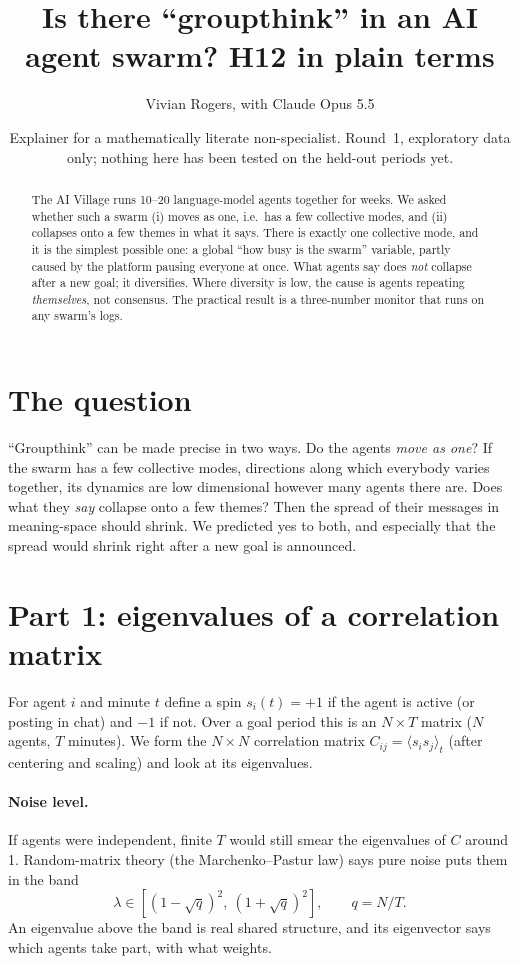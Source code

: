 \documentclass[aps,pre,reprint,10pt,nofootinbib]{revtex4-2}
\begin{document}
\title{Is there ``groupthink'' in an AI agent swarm? H12 in plain terms}
\author{Vivian Rogers, with Claude Opus 5.5}
\date[]{Explainer for a mathematically literate non-specialist. Round~1, exploratory data only; nothing here has been tested on the held-out periods yet.}

\begin{abstract}
The AI Village runs 10--20 language-model agents together for weeks. We asked whether such a swarm (i) moves as one, i.e.\ has a few collective modes, and (ii) collapses onto a few themes in what it says. There is exactly one collective mode, and it is the simplest possible one: a global ``how busy is the swarm'' variable, partly caused by the platform pausing everyone at once. What agents say does \emph{not} collapse after a new goal; it diversifies. Where diversity is low, the cause is agents repeating \emph{themselves}, not consensus. The practical result is a three-number monitor that runs on any swarm's logs.
\end{abstract}
\maketitle

\section{The question}
``Groupthink'' can be made precise in two ways. Do the agents \emph{move as one}? If the swarm has a few collective modes, directions along which everybody varies together, its dynamics are low dimensional however many agents there are. Does what they \emph{say} collapse onto a few themes? Then the spread of their messages in meaning-space should shrink. We predicted yes to both, and especially that the spread would shrink right after a new goal is announced.

\section{Part 1: eigenvalues of a correlation matrix}
For agent $i$ and minute $t$ define a spin $s_i(t)=+1$ if the agent is active (or posting in chat) and $-1$ if not. Over a goal period this is an $N\times T$ matrix ($N$ agents, $T$ minutes). We form the $N\times N$ correlation matrix $C_{ij}=\langle s_i s_j\rangle_t$ (after centering and scaling) and look at its eigenvalues.

\paragraph{Noise level.} If agents were independent, finite $T$ would still smear the eigenvalues of $C$ around 1. Random-matrix theory (the Marchenko--Pastur law) says pure noise puts them in the band
\begin{equation}
\lambda \in \left[(1-\sqrt{q})^2,\ (1+\sqrt{q})^2\right],\qquad q=N/T .
\end{equation}
An eigenvalue above the band is real shared structure, and its eigenvector says which agents take part, with what weights.
\end{document}
